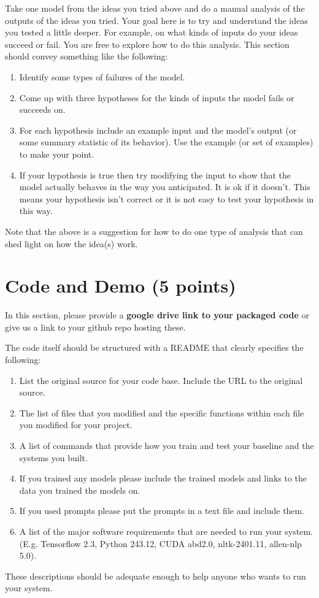\documentclass[11pt,a4paper]{article}
\begin{document}
Take one model from the ideas you tried above and do a manual analysis of the outputs of the ideas you tried. Your goal here is to try and understand the ideas you tested a little deeper. For example, on what kinds of inputs do your ideas succeed or fail. You are free to explore how to do this analysis. This section should convey something like the following:
\begin{enumerate}
\item Identify some types of failures of the model.
\item Come up with three hypotheses for the kinds of inputs the model fails or succeeds on.
\item For each hypothesis include an example input and the model's output (or some summary statistic of its behavior). Use the example (or set of examples) to make your point.
\item If your hypothesis is true then try modifying the input to show that the model actually behaves in the way you anticipated. It is ok if it doesn't. This means your hypothesis isn't correct or it is not easy to test your hypothesis in this way.
\end{enumerate}

Note that the above is a suggestion for how to do one type of analysis that can shed light on how the idea(s) work. 

\section{Code and Demo (5 points)}

In this section, please provide a {\bf google drive link to your packaged code} or give us a link to your github repo hosting these.  

The code itself should be structured with a README that clearly specifies the following:
\begin{enumerate}
\item List the original source for your code base. Include the URL to the original source. 
\item The list of files that you modified and the specific functions within each file you modified for your project. 
\item A list of commands that provide how you train and test your baseline and the systems you built.
\item If you trained any models please include the trained models and links to the data you trained the models on.
\item If you used prompts please put the prompts in a text file and include them.
\item A list of the major software requirements that are needed to run your system. (E.g. Tensorflow 2.3, Python 243.12, CUDA abd2.0, nltk-2401.11, allen-nlp 5.0). 
\end{enumerate}
These descriptions should be adequate enough to help anyone who wants to run your system. 
\end{document}
